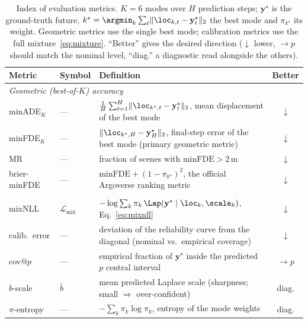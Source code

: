 \begin{table}[htbp]
  \centering
  \caption{Index of evaluation metrics. $K{=}6$ modes over $H$ prediction steps;
    $\mathbf{y}^\star$ is the ground-truth future,
    $k^\star=\argmin_k\sum_t\lVert\loc_{k,t}-\mathbf{y}^\star_t\rVert_2$ the best mode
    and $\pi_{k^\star}$ its weight. Geometric metrics use the single best mode;
    calibration metrics use the full mixture~\eqref{eq:mixture}. ``Better'' gives the
    desired direction ($\downarrow$ lower, $\to p$ should match the nominal level,
    ``diag.'' a diagnostic read alongside the others).}
  \label{tab:metrics}
  \small
  \begin{tabular}{llp{6.6cm}c}
    \toprule
    Metric & Symbol & Definition & Better \\
    \midrule
    \multicolumn{4}{l}{\emph{Geometric (best-of-$K$) accuracy}} \\
    minADE$_K$    & --- & $\frac{1}{H}\sum_{t=1}^{H}\lVert\loc_{k^\star,t}-\mathbf{y}^\star_t\rVert_2$, mean displacement of the best mode & $\downarrow$ \\
    minFDE$_K$    & --- & $\lVert\loc_{k^\star,H}-\mathbf{y}^\star_H\rVert_2$, final-step error of the best mode (primary geometric metric) & $\downarrow$ \\
    MR            & --- & fraction of scenes with $\text{minFDE}>2\,\mathrm{m}$ & $\downarrow$ \\
    brier-minFDE  & --- & $\text{minFDE}+(1-\pi_{k^\star})^2$, the official Argoverse ranking metric & $\downarrow$ \\
    \addlinespace
    \multicolumn{4}{l}{\emph{Calibration (full-distribution) quality}} \\
    mixNLL        & $\mathcal{L}_{\mathrm{mix}}$ & $-\log\sum_{k}\pi_k\,\Lap(\mathbf{y}^\star\mid\loc_k,\scale_k)$, Eq.~\eqref{eq:mixnll} & $\downarrow$ \\
    calib.\ error & --- & deviation of the reliability curve from the diagonal (nominal vs.\ empirical coverage) & $\downarrow$ \\
    cov@$p$       & --- & empirical fraction of $\mathbf{y}^\star$ inside the predicted $p$ central interval & $\to p$ \\
    $b$-scale     & $\bar{b}$ & mean predicted Laplace scale (sharpness; small $\Rightarrow$ over-confident) & diag. \\
    $\pi$-entropy & --- & $-\sum_{k}\pi_k\log\pi_k$, entropy of the mode weights & diag. \\
    \bottomrule
  \end{tabular}
\end{table}

